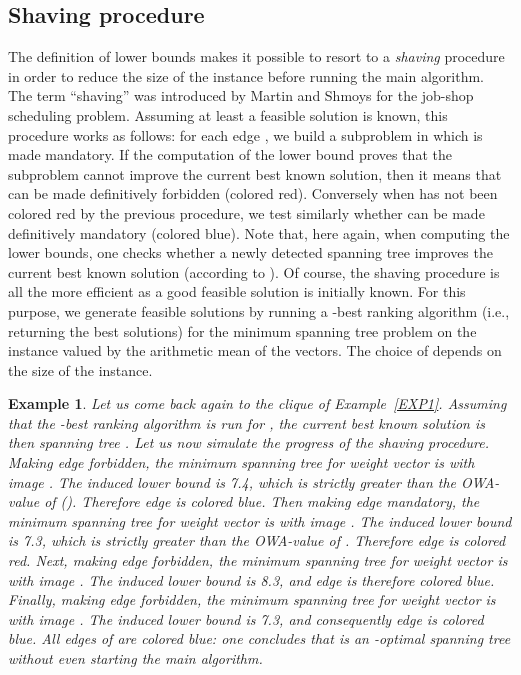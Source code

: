 \documentclass[final,3p,times]{elsarticle}
\newtheorem{example}{Example}
\begin{document}
\subsection{Shaving procedure}
The definition of lower bounds makes it possible to resort to a \emph{shaving} procedure in order to reduce the size of the instance before running the main algorithm. The term ``shaving'' was introduced by Martin and Shmoys \cite{MartinShmoys96} for the job-shop scheduling problem. Assuming at least a feasible solution is known, this procedure works as follows: for each edge , we build a subproblem in which  is made mandatory. If the computation of the lower bound proves that the subproblem cannot improve the current best known solution, then it means that  can be made definitively forbidden (colored red). Conversely when  has not been colored red by the previous procedure, we test similarly whether  can be made definitively mandatory (colored blue). Note that, here again, when computing the lower bounds, one checks whether a newly detected spanning tree improves the current best known solution (according to ). Of course, the shaving procedure is all the more efficient as a good feasible solution is initially known. For this purpose, we generate  feasible solutions by running a -best ranking algorithm (i.e., returning the  best solutions) for the minimum spanning tree problem on the instance valued by the arithmetic mean of the vectors. The choice of  depends on the size of the instance.

\begin{example}
Let us come back again to the clique of Example~\ref{EXP1}. Assuming that
the -best ranking algorithm is run for , the current best known solution is then spanning tree . Let us now
simulate the progress of the shaving procedure. Making edge 
forbidden, the minimum spanning tree for weight vector  is  with image . The induced lower bound is 7.4, which is strictly greater
than the OWA-value of  (). Therefore edge 
is colored blue. Then making edge  mandatory, the minimum spanning
tree for weight vector  is
 with image . The induced lower
bound is 7.3, which is strictly greater than the OWA-value of
. Therefore edge  is colored red. 
Next, making edge  forbidden, the minimum spanning tree for
weight vector  is 
with image . The induced lower bound is 8.3, and edge
 is therefore colored blue. Finally, making edge 
forbidden, the minimum spanning tree for weight vector  is  with image . The induced lower bound is 7.3, and consequently edge
 is colored blue. All edges of  are colored blue: one concludes
that  is an -optimal spanning tree without even starting the
main algorithm. 
\end{example}
\end{document}
